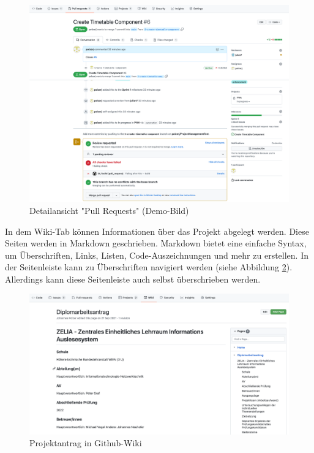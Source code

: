 \begin{figure}[H]
    \centering
    \includegraphics[width=\textwidth]{media/ProjectManagement/PullInfo.png}
    \caption{Detailansicht "Pull Requests" (Demo-Bild)}
    \label{fig:pullInfo}
\end{figure}


In dem Wiki-Tab können Informationen über das Projekt abgelegt werden. Diese Seiten werden in Markdown geschrieben. Markdown bietet eine einfache Syntax, um Überschriften, Links, Listen, Code-Auszeichnungen und mehr zu erstellen. In der Seitenleiste kann zu Überschriften navigiert werden (siehe Abbildung \ref{fig:Projektantrag}). Allerdings kann diese Seitenleiste auch selbst überschrieben werden.

\begin{figure}[H]
    \centering
    \includegraphics[width=\textwidth]{media/ProjectManagement/Wiki.png}
    \caption{Projektantrag in Github-Wiki}
    \label{fig:Projektantrag}
\end{figure}

